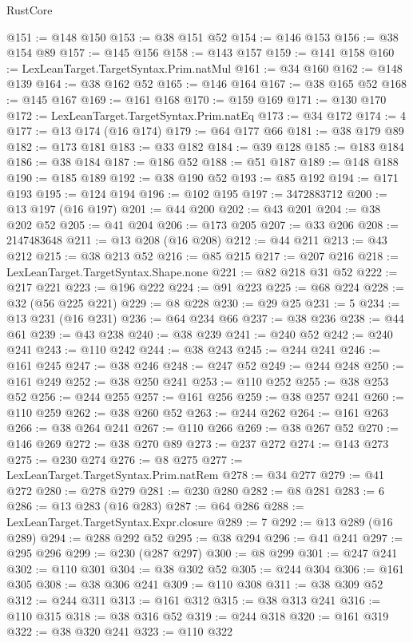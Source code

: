 \begin{lexlean}{RustCore}
\begin{coremodule}
@151 := @148 @150
@153 := @38 @151 @52
@154 := @146 @153
@156 := @38 @154 @89
@157 := @145 @156
@158 := @143 @157
@159 := @141 @158
@160 := LexLeanTarget.TargetSyntax.Prim.natMul
@161 := @34 @160
@162 := @148 @139
@164 := @38 @162 @52
@165 := @146 @164
@167 := @38 @165 @52
@168 := @145 @167
@169 := @161 @168
@170 := @159 @169
@171 := @130 @170
@172 := LexLeanTarget.TargetSyntax.Prim.natEq
@173 := @34 @172
@174 := 4
@177 := @13 @174 (@16 @174)
@179 := @64 @177 @66
@181 := @38 @179 @89
@182 := @173 @181
@183 := @33 @182
@184 := @39 @128
@185 := @183 @184
@186 := @38 @184
@187 := @186 @52
@188 := @51 @187
@189 := @148 @188
@190 := @185 @189
@192 := @38 @190 @52
@193 := @85 @192
@194 := @171 @193
@195 := @124 @194
@196 := @102 @195
@197 := 3472883712
@200 := @13 @197 (@16 @197)
@201 := @44 @200
@202 := @43 @201
@204 := @38 @202 @52
@205 := @41 @204
@206 := @173 @205
@207 := @33 @206
@208 := 2147483648
@211 := @13 @208 (@16 @208)
@212 := @44 @211
@213 := @43 @212
@215 := @38 @213 @52
@216 := @85 @215
@217 := @207 @216
@218 := LexLeanTarget.TargetSyntax.Shape.none
@221 := @82 @218 @31 @52
@222 := @217 @221
@223 := @196 @222
@224 := @91 @223
@225 := @68 @224
@228 := @32 (@56 @225 @221)
@229 := @8 @228
@230 := @29 @25
@231 := 5
@234 := @13 @231 (@16 @231)
@236 := @64 @234 @66
@237 := @38 @236
@238 := @44 @61
@239 := @43 @238
@240 := @38 @239
@241 := @240 @52
@242 := @240 @241
@243 := @110 @242
@244 := @38 @243
@245 := @244 @241
@246 := @161 @245
@247 := @38 @246
@248 := @247 @52
@249 := @244 @248
@250 := @161 @249
@252 := @38 @250 @241
@253 := @110 @252
@255 := @38 @253 @52
@256 := @244 @255
@257 := @161 @256
@259 := @38 @257 @241
@260 := @110 @259
@262 := @38 @260 @52
@263 := @244 @262
@264 := @161 @263
@266 := @38 @264 @241
@267 := @110 @266
@269 := @38 @267 @52
@270 := @146 @269
@272 := @38 @270 @89
@273 := @237 @272
@274 := @143 @273
@275 := @230 @274
@276 := @8 @275
@277 := LexLeanTarget.TargetSyntax.Prim.natRem
@278 := @34 @277
@279 := @41 @272
@280 := @278 @279
@281 := @230 @280
@282 := @8 @281
@283 := 6
@286 := @13 @283 (@16 @283)
@287 := @64 @286
@288 := LexLeanTarget.TargetSyntax.Expr.closure
@289 := 7
@292 := @13 @289 (@16 @289)
@294 := @288 @292 @52
@295 := @38 @294
@296 := @41 @241
@297 := @295 @296
@299 := @230 (@287 @297)
@300 := @8 @299
@301 := @247 @241
@302 := @110 @301
@304 := @38 @302 @52
@305 := @244 @304
@306 := @161 @305
@308 := @38 @306 @241
@309 := @110 @308
@311 := @38 @309 @52
@312 := @244 @311
@313 := @161 @312
@315 := @38 @313 @241
@316 := @110 @315
@318 := @38 @316 @52
@319 := @244 @318
@320 := @161 @319
@322 := @38 @320 @241
@323 := @110 @322

\end{coremodule}
\end{lexlean}
